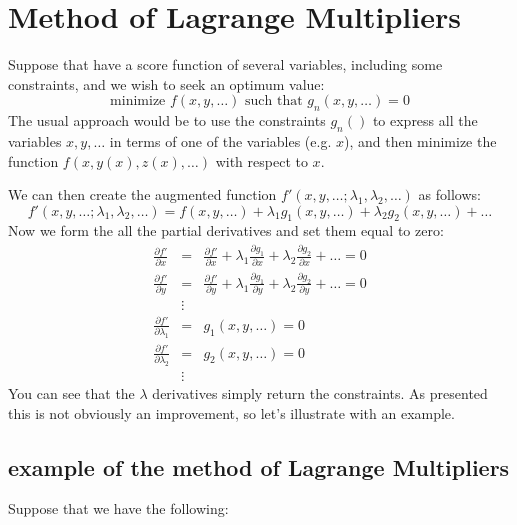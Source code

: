 \section{Method of Lagrange Multipliers}

Suppose that have a score function of several variables, including some constraints, and we wish to seek an optimum value:
\begin{equation}
\textrm{minimize } f(x, y, \ldots) \textrm{ such that } g_n(x, y, \ldots) = 0
\end{equation}
The usual approach would be to use the constraints $g_n()$ to express all the variables $x, y, \ldots$ in terms of one of the 
variables (e.g. $x$), and then minimize the function $f(x, y(x), z(x), \ldots)$ with respect to $x$.

We can then create the augmented function $f'(x, y, \dots; \lambda_1, \lambda_2, \ldots)$ as follows:
\begin{equation}
f'(x, y, \ldots; \lambda_1, \lambda_2, \ldots) = f(x, y, \ldots) + \lambda_1 g_1(x, y, \ldots) + \lambda_2 g_2(x, y, \ldots) + \ldots
\end{equation}
Now we form the all the partial derivatives and set them equal to zero:
\begin{eqnarray}
\frac{\partial f'}{\partial x} &=& \frac{\partial f'}{\partial x} + \lambda_1 \frac{\partial g_1}{\partial x}+ \lambda_2 \frac{\partial g_2}{\partial x} + \ldots = 0 \\
\frac{\partial f'}{\partial y} &=& \frac{\partial f'}{\partial y} + \lambda_1 \frac{\partial g_1}{\partial y} + \lambda_2 \frac{\partial g_2}{\partial y} + \ldots = 0\\
&\vdots& \\
\frac{\partial f'}{\partial \lambda_1} &=& g_1(x, y, \ldots) = 0\\
\frac{\partial f'}{\partial \lambda_2} &=& g_2(x, y, \ldots) = 0\\
&\vdots&
\end{eqnarray}
You can see that the $\lambda$ derivatives simply return the constraints.   As presented this is not obviously an improvement, so let's illustrate with an example.

\subsection{example of the method of  Lagrange Multipliers}

Suppose that we have the following:

